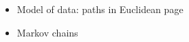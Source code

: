 \label{sec:preliminaries}

\begin{itemize}
\item Model of data: paths in Euclidean page
\item Markov chains
\end{itemize}